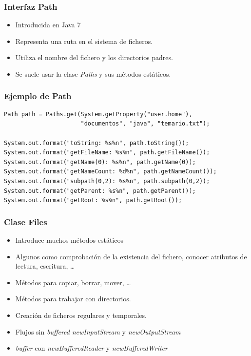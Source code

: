 \documentclass{beamer}
\begin{document}
\begin{frame}[fragile]
\frametitle{Interfaz Path}
\begin{itemize}[<+->]
\item Introducida en Java 7
\item Representa una ruta en el sistema de ficheros.
\item Utiliza el nombre del fichero y los directorios padres.
\item Se suele usar la clase \emph{Paths} y sus métodos estáticos.
\end{itemize}
\pause
\end{frame}

\begin{frame}[fragile]
\frametitle{Ejemplo de Path}
\begin{small}
\begin{verbatim}
Path path = Paths.get(System.getProperty("user.home"),
                      "documentos", "java", "temario.txt");

System.out.format("toString: %s%n", path.toString());
System.out.format("getFileName: %s%n", path.getFileName());
System.out.format("getName(0): %s%n", path.getName(0));
System.out.format("getNameCount: %d%n", path.getNameCount());
System.out.format("subpath(0,2): %s%n", path.subpath(0,2));
System.out.format("getParent: %s%n", path.getParent());
System.out.format("getRoot: %s%n", path.getRoot());
\end{verbatim}
\end{small}
\end{frame}



\begin{frame}[fragile]
\frametitle{Clase Files}
\begin{itemize}[<+->]
\item Introduce muchos métodos estáticos
\item Algunos como comprobación de la existencia del fichero, conocer atributos de lectura, escritura, \dots
\item Métodos para copiar, borrar, mover, \dots
\item Métodos para trabajar con directorios.
\item Creación de ficheros regulares y temporales.
\item Flujos sin \emph{buffered} \emph{newInputStream} y \emph{newOutputStream}
\item \emph{buffer} con \emph{newBufferedReader} y \emph{newBufferedWriter}
\end{itemize}
\pause
\end{frame}
\end{document}
